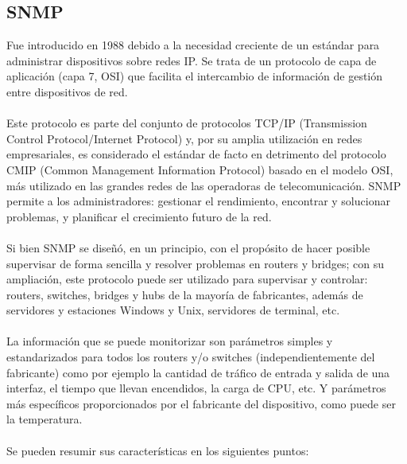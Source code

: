 \documentclass[letterpaper]{article}
\begin{document}
\subsection{SNMP} %
Fue introducido en 1988 debido a la necesidad creciente de un estándar para
administrar dispositivos sobre redes IP. Se trata de un protocolo de capa de aplicación
(capa 7, OSI) que facilita el intercambio de información de gestión entre dispositivos de
red.\\\\
Este protocolo es parte del conjunto de protocolos TCP/IP (Transmission
Control Protocol/Internet Protocol) y, por su amplia utilización en redes empresariales,
es considerado el estándar de facto en detrimento del protocolo CMIP (Common
Management Information Protocol) basado en el modelo OSI, más utilizado en las
grandes redes de las operadoras de telecomunicación. SNMP permite a los
administradores: gestionar el rendimiento, encontrar y solucionar problemas, y
planificar el crecimiento futuro de la red.\\\\
Si bien SNMP se diseñó, en un principio, con el propósito de hacer posible
supervisar de forma sencilla y resolver problemas en routers y bridges; con su
ampliación, este protocolo puede ser utilizado para supervisar y controlar: routers,
switches, bridges y hubs de la mayoría de fabricantes, además de servidores y
estaciones Windows y Unix, servidores de terminal, etc.\\\\
La información que se puede monitorizar son parámetros simples y
estandarizados para todos los routers y/o switches (independientemente del fabricante)
como por ejemplo la cantidad de tráfico de entrada y salida de una interfaz, el tiempo
que llevan encendidos, la carga de CPU, etc. Y parámetros más específicos
proporcionados por el fabricante del dispositivo, como puede ser la temperatura.\\\\
Se pueden resumir sus características en los siguientes puntos:
\end{document}
